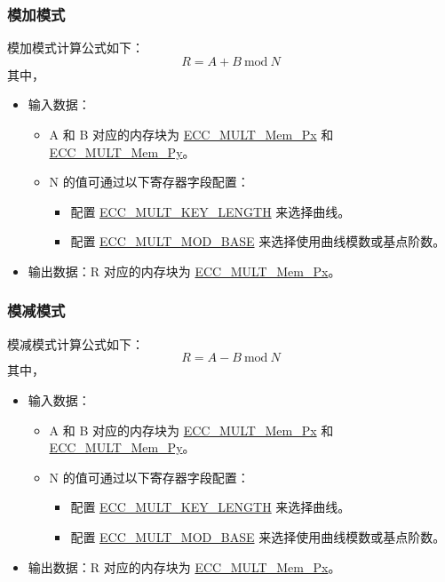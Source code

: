 \documentclass[main\_\_CN.tex]{subfiles}
\begin{document}
\subsubsection{模加模式}
模加模式计算公式如下：
\[
R = A + B \ \textrm{mod}\ N
\]
其中，
\begin{itemize}
    \item 输入数据：
    \begin{itemize}
        \item A 和 B 对应的内存块为 \hyperref[tab:ecc-memory]{ECC\_MULT\_Mem\_Px} 和 \hyperref[tab:ecc-memory]{ECC\_MULT\_Mem\_Py}。
        \item N 的值可通过以下寄存器字段配置：
        \begin{itemize}
            \item 配置 \hyperref[fielddesc:ECCMULTKEYLENGTH]{ECC\_MULT\_KEY\_LENGTH} 来选择曲线。
            \item 配置 \hyperref[fielddesc:ECCMULTMODBASE]{ECC\_MULT\_MOD\_BASE} 来选择使用曲线模数或基点阶数。
        \end{itemize}
    \end{itemize}
    \item 输出数据：R 对应的内存块为 \hyperref[tab:ecc-memory]{ECC\_MULT\_Mem\_Px}。
\end{itemize}

\subsubsection{模减模式}
模减模式计算公式如下：
\[
R = A - B \ \textrm{mod}\ N
\]
其中，
\begin{itemize}
    \item 输入数据：
    \begin{itemize}
        \item A 和 B 对应的内存块为 \hyperref[tab:ecc-memory]{ECC\_MULT\_Mem\_Px} 和 \hyperref[tab:ecc-memory]{ECC\_MULT\_Mem\_Py}。
        \item N 的值可通过以下寄存器字段配置：
        \begin{itemize}
            \item 配置 \hyperref[fielddesc:ECCMULTKEYLENGTH]{ECC\_MULT\_KEY\_LENGTH} 来选择曲线。
            \item 配置 \hyperref[fielddesc:ECCMULTMODBASE]{ECC\_MULT\_MOD\_BASE} 来选择使用曲线模数或基点阶数。
        \end{itemize}
    \end{itemize}
    \item 输出数据：R 对应的内存块为 \hyperref[tab:ecc-memory]{ECC\_MULT\_Mem\_Px}。
\end{itemize}
\end{document}
